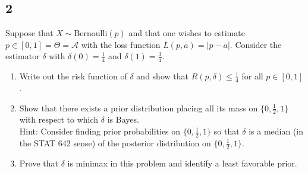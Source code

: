 \documentclass[12pt]{article}
\begin{document}
\subsection*{2}
\begin{tcolorbox}
  Suppose that $X\sim$Bernoulli$(p)$ and that one wishes to estimate $p\in[0,1]=\Theta=\mathcal{A}$ with the loss function $L(p,a)=|p-a|$.  
  Consider the estimator $\delta$ with $\delta(0)=\frac{1}{4}$ and $\delta(1)=\frac{3}{4}$.
  \begin{enumerate}[label=(\alph*)]
    \item Write out the risk function of $\delta$ and show that $R(p,\delta)\leq \frac{1}{4}$ for all $p\in[0,1]$.
    \item Show that there exists a prior distribution placing all its mass on $\{0,\frac{1}{2},1\}$ with respect to which $\delta$ is Bayes.\\
      Hint: Consider finding   prior probabilities on $\{0,\frac{1}{2},1\}$ so that $\delta$ is a median (in the STAT 642 sense) of the posterior distribution on $\{0,\frac{1}{2},1\}$.
    \item Prove that $\delta$ is minimax in this problem and identify a least favorable prior.
  \end{enumerate}
\end{tcolorbox}
\end{document}
